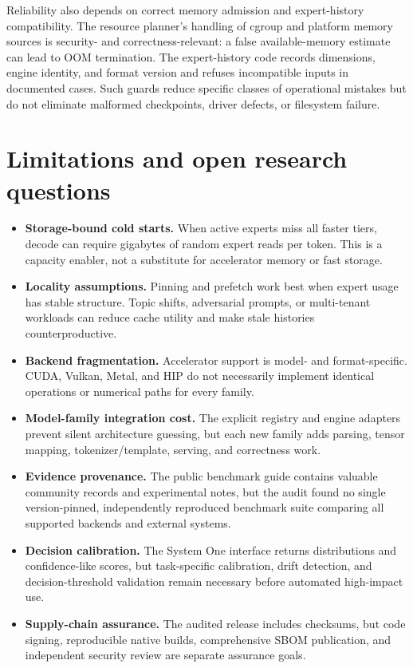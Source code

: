 \documentclass[10pt,twocolumn]{article}
\begin{document}
Reliability also depends on correct memory admission and expert-history compatibility. The resource planner's handling of cgroup and platform memory sources is security- and correctness-relevant: a false available-memory estimate can lead to OOM termination. The expert-history code records dimensions, engine identity, and format version and refuses incompatible inputs in documented cases. Such guards reduce specific classes of operational mistakes but do not eliminate malformed checkpoints, driver defects, or filesystem failure.

\section{Limitations and open research questions}
\begin{itemize}
  \item \textbf{Storage-bound cold starts.} When active experts miss all faster tiers, decode can require gigabytes of random expert reads per token. This is a capacity enabler, not a substitute for accelerator memory or fast storage.
  \item \textbf{Locality assumptions.} Pinning and prefetch work best when expert usage has stable structure. Topic shifts, adversarial prompts, or multi-tenant workloads can reduce cache utility and make stale histories counterproductive.
  \item \textbf{Backend fragmentation.} Accelerator support is model- and format-specific. CUDA, Vulkan, Metal, and HIP do not necessarily implement identical operations or numerical paths for every family.
  \item \textbf{Model-family integration cost.} The explicit registry and engine adapters prevent silent architecture guessing, but each new family adds parsing, tensor mapping, tokenizer/template, serving, and correctness work.
  \item \textbf{Evidence provenance.} The public benchmark guide contains valuable community records and experimental notes, but the audit found no single version-pinned, independently reproduced benchmark suite comparing all supported backends and external systems.
  \item \textbf{Decision calibration.} The System One interface returns distributions and confidence-like scores, but task-specific calibration, drift detection, and decision-threshold validation remain necessary before automated high-impact use.
  \item \textbf{Supply-chain assurance.} The audited release includes checksums, but code signing, reproducible native builds, comprehensive SBOM publication, and independent security review are separate assurance goals.
\end{itemize}
\end{document}
